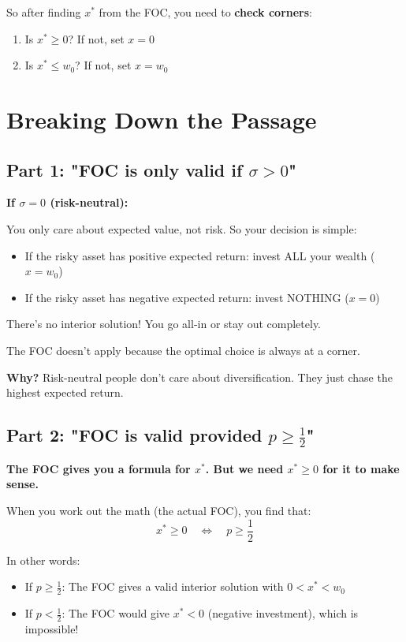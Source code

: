 \documentclass[12pt]{article}
\begin{document}
So after finding $x^*$ from the FOC, you need to \textbf{check corners}:
\begin{enumerate}
\item Is $x^* \geq 0$? If not, set $x = 0$
\item Is $x^* \leq w_0$? If not, set $x = w_0$
\end{enumerate}

\newpage

\section*{Breaking Down the Passage}

\subsection*{Part 1: "FOC is only valid if $\sigma > 0$"}

\begin{tcolorbox}[colback=yellow!10!white,colframe=orange!75!black]
\textbf{If $\sigma = 0$ (risk-neutral):}

You only care about expected value, not risk. So your decision is simple:

\begin{itemize}
\item If the risky asset has positive expected return: invest ALL your wealth ($x = w_0$)
\item If the risky asset has negative expected return: invest NOTHING ($x = 0$)
\end{itemize}

There's no interior solution! You go all-in or stay out completely.

The FOC doesn't apply because the optimal choice is always at a corner.
\end{tcolorbox}

\textbf{Why?} Risk-neutral people don't care about diversification. They just chase the highest expected return.

\subsection*{Part 2: "FOC is valid provided $p \geq \frac{1}{2}$"}

\begin{tcolorbox}[colback=green!5!white,colframe=green!75!black]
\textbf{The FOC gives you a formula for $x^*$. But we need $x^* \geq 0$ for it to make sense.}

When you work out the math (the actual FOC), you find that:
\[
x^* \geq 0 \quad \Leftrightarrow \quad p \geq \frac{1}{2}
\]

In other words:
\begin{itemize}
\item If $p \geq \frac{1}{2}$: The FOC gives a valid interior solution with $0 < x^* < w_0$
\item If $p < \frac{1}{2}$: The FOC would give $x^* < 0$ (negative investment), which is impossible!
\end{itemize}
\end{tcolorbox}
\end{document}
